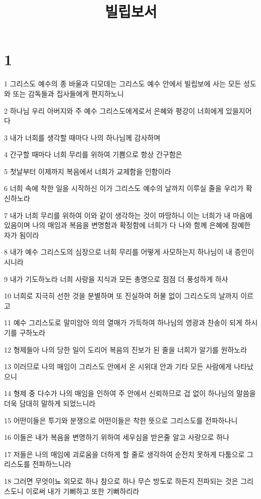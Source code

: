 

\title{빌립보서}


\chapter{1}

\par 1 그리스도 예수의 종 바울과 디모데는 그리스도 예수 안에서 빌립보에 사는 모든 성도와 또는 감독들과 집사들에게 편지하노니
\par 2 하나님 우리 아버지와 주 예수 그리스도에게로서 은혜와 평강이 너희에게 있을지어다
\par 3 내가 너희를 생각할 때마다 나의 하나님께 감사하며
\par 4 간구할 때마다 너희 무리를 위하여 기쁨으로 항상 간구함은
\par 5 첫날부터 이제까지 복음에서 너희가 교제함을 인함이라
\par 6 너희 속에 착한 일을 시작하신 이가 그리스도 예수의 날까지 이루실 줄을 우리가 확신하노라
\par 7 내가 너희 무리를 위하여 이와 같이 생각하는 것이 마땅하니 이는 너희가 내 마음에 있음이며 나의 매임과 복음을 변명함과 확정함에 너희가 다 나와 함께 은혜에 참예한 자가 됨이라
\par 8 내가 예수 그리스도의 심장으로 너희 무리를 어떻게 사모하는지 하나님이 내 증인이시니라
\par 9 내가 기도하노라 너희 사랑을 지식과 모든 총명으로 점점 더 풍성하게 하사
\par 10 너희로 지극히 선한 것을 분별하며 또 진실하여 허물 없이 그리스도의 날까지 이르고
\par 11 예수 그리스도로 말미암아 의의 열매가 가득하여 하나님의 영광과 찬송이 되게 하시기를 구하노라
\par 12 형제들아 나의 당한 일이 도리어 복음의 진보가 된 줄을 너희가 알기를 원하노라
\par 13 이러므로 나의 매임이 그리스도 안에서 온 시위대 안과 기타 모든 사람에게 나타났으니
\par 14 형제 중 다수가 나의 매임을 인하여 주 안에서 신뢰하므로 겁 없이 하나님의 말씀을 더욱 담대히 말하게 되었느니라
\par 15 어떤이들은 투기와 분쟁으로 어떤이들은 착한 뜻으로 그리스도를 전파하나니
\par 16 이들은 내가 복음을 변명하기 위하여 세우심을 받은줄 알고 사랑으로 하나
\par 17 저들은 나의 매임에 괴로움을 더하게 할 줄로 생각하여 순전치 못하게 다툼으로 그리스도를 전파하느니라
\par 18 그러면 무엇이뇨 외모로 하나 참으로 하나 무슨 방도로 하든지 전파되는 것은 그리스도니 이로써 내가 기뻐하고 또한 기뻐하리라
